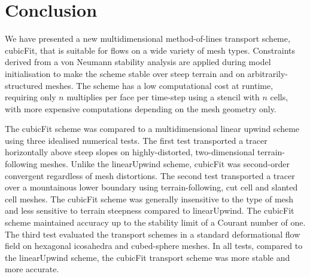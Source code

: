 \section{Conclusion}
\label{sec:conclusion}

We have presented a new multidimensional method-of-lines transport scheme, cubicFit, that is suitable for flows on a wide variety of mesh types.  Constraints derived from a von Neumann stability analysis are applied during model initialisation to make the scheme stable over steep terrain and on arbitrarily-structured meshes.
The scheme has a low computational cost at runtime, requiring only $n$ multiplies per face per time-step using a stencil with $n$ cells, with more expensive computations depending on the mesh geometry only.

The cubicFit scheme was compared to a multidimensional linear upwind scheme using three idealised numerical tests.
The first test transported a tracer horizontally above steep slopes on highly-distorted, two-dimensional terrain-following meshes.  Unlike the linearUpwind scheme, cubicFit was second-order convergent regardless of mesh distortions.
The second test transported a tracer over a mountainous lower boundary using terrain-following, cut cell and slanted cell meshes.
The cubicFit scheme was generally insensitive to the type of mesh and less sensitive to terrain steepness compared to linearUpwind.  The cubicFit scheme maintained accuracy up to the stability limit of a Courant number of one.
The third test evaluated the transport schemes in a standard deformational flow field on hexagonal icosahedra and cubed-sphere meshes.
In all tests, compared to the linearUpwind scheme, the cubicFit transport scheme was more stable and more accurate.

